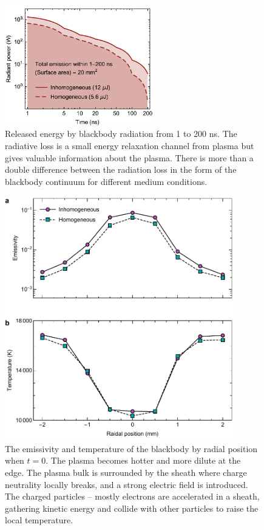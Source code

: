 \begin{figure}[ht!]
\centering
\includegraphics[width=65mm]{figures/ch4/blackbody/loss.pdf}
\caption{Released energy by blackbody radiation from 1 to 200 ns. The radiative loss is a small energy relaxation channel from plasma but gives valuable information about the plasma. There is more than a double difference between the radiation loss in the form of the blackbody continuum for different medium conditions.}
\label{fig:emissionLoss}
\end{figure}

\begin{figure}[ht!]
\centering
\includegraphics[width=100mm]{figures/ch4/blackbody/radial.pdf}
\caption{The emissivity and temperature of the blackbody by radial position when $t = 0$. The plasma becomes hotter and more dilute at the edge. The plasma bulk is surrounded by the sheath where charge neutrality locally breaks, and a strong electric field is introduced. The charged particles -- mostly electrons are accelerated in a sheath, gathering kinetic energy and collide with other particles to raise the local temperature.}
\label{fig:blackbodyRadial}
\end{figure}

